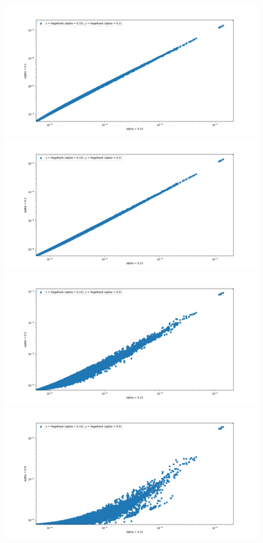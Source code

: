 \documentclass[a4paper]{report}
\begin{document}
\begin{center}
  \includegraphics[width=0.25\paperwidth]{assets/pagerank01.png}
  \includegraphics[width=0.25\paperwidth]{assets/pagerank02.png}
  \includegraphics[width=0.25\paperwidth]{assets/pagerank05.png}
  \includegraphics[width=0.25\paperwidth]{assets/pagerank09.png}
\end{center}
\end{document}
